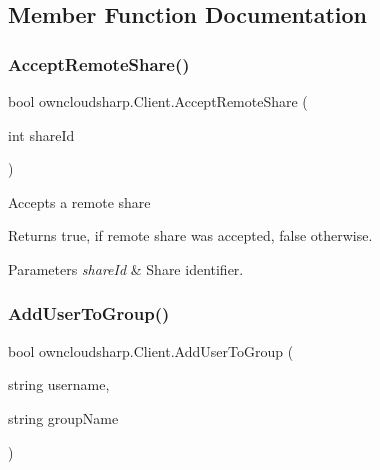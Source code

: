 \subsection{Member Function Documentation}
\mbox{\label{classowncloudsharp_1_1_client_ace55eb0544bda9803e493dd80af14970}} 
\subsubsection{\texorpdfstring{Accept\+Remote\+Share()}{AcceptRemoteShare()}}
{\footnotesize\ttfamily bool owncloudsharp.\+Client.\+Accept\+Remote\+Share (\begin{DoxyParamCaption}\item[{int}]{share\+Id }\end{DoxyParamCaption})}



Accepts a remote share 

\begin{DoxyReturn}{Returns}
{\ttfamily true}, if remote share was accepted, {\ttfamily false} otherwise.
\end{DoxyReturn}

\begin{DoxyParams}{Parameters}
{\em share\+Id} & Share identifier.\\
\hline
\end{DoxyParams}
\mbox{\label{classowncloudsharp_1_1_client_a7b8657d971f2b1a9f27f2b8cfc73a21b}} 
\subsubsection{\texorpdfstring{Add\+User\+To\+Group()}{AddUserToGroup()}}
{\footnotesize\ttfamily bool owncloudsharp.\+Client.\+Add\+User\+To\+Group (\begin{DoxyParamCaption}\item[{string}]{username,  }\item[{string}]{group\+Name }\end{DoxyParamCaption})}



